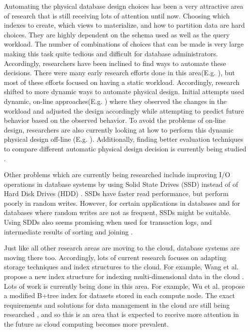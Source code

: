 \documentclass[12pt,a4paper]{article}
\begin{document}
Automating the physical database design choices has been a very attractive area of research that is still receiving lots of attention until now. Choosing which
indexes to create, which views to materialize, and how to partition data are hard choices. They are highly dependent on the schema used as well
as the query workload. The number of combinations of choices that can be made is very large making this task quite tedious and difficult for database
administrators. Accordingly, researchers have been inclined to find ways to automate these decisions. There were many early research efforts done in this
area(E.g. \cite{finkelstein1988physical, chaudhuri1997overview, hammer76selec, frank1992selec, schiefer1999db2, valentin2000select}), but most of these efforts
focused on having a static workload. Accordingly, research shifted to more dynamic ways to automate physical design. Initial attempts used dynamic, on-line
approaches(E.g. \cite{bruno2007online, sattler2003, schnaitter2007}) where they observed the changes in the workload and adjusted the design accordingly while
attempting to predict future behavior based on the observed behavior. To avoid the problems of on-line design, researchers are also currently looking at how to
perform this dynamic physical design off-line (E.g. \cite{hannes2008,agrawal2006}). Additionally, finding better evaluation techniques to compare different
automatic physical design decision is currently being studied \cite{gebaly2008}.

Other problems which are currently being researched include improving I/O operations in database systems by using Solid State Drives (SSD) instead of of Hard
Disk Drives (HDD) \cite{lee2009, du2009, lee2008}. SSDs have faster read performance, but perform poorly in random writes. However, for certain applications in
databases and for databases where random writes are not as frequent, SSDs might be suitable. Using SDDs also seems promising when used for
transaction logs, and intermediate results of sorting and joining \cite{lee2008}.

Just like all other research areas are moving to the cloud, database systems are moving there too. Accordingly, lots of current research focuses on adapting
storage techniques and index structures to the cloud. For example, Wang et al. propose a new index structure for indexing multi-dimensional data in the
cloud \cite{wang2010indexing}. Lots of work is currently being done in this area. For example, Wu et al. \cite{wu2010efficient} propose a modified B+tree index
for datasets stored in each compute node. The exact requirements and solutions for data management in the cloud are still being
researched \cite{abadi2009data}, and so this is an area that is expected to receive more attention in the future as cloud computing becomes more prevalent.
\end{document}
